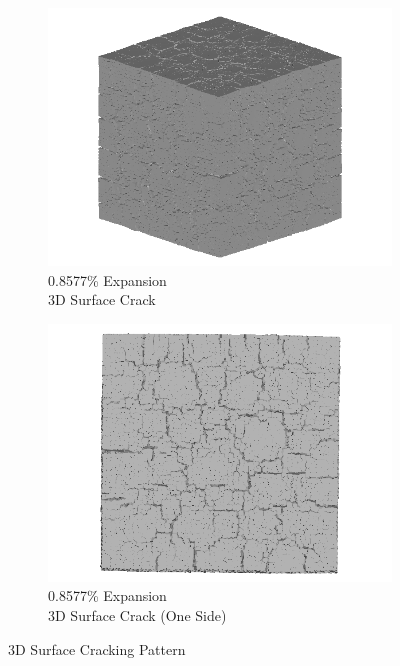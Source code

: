 \begin{figure}[ht!]
    \begin{subfigure}{.5\textwidth}
      \centering
      \includegraphics[width=0.5\linewidth]{Files/exp_3D/DEF/A30X-5C_4_3d.png}
      \caption{0.8577\% Expansion\\3D Surface Crack}
    \end{subfigure}%
    \begin{subfigure}{.5\textwidth}
      \centering
      \includegraphics[width=0.5\linewidth]{Files/exp_3D/DEF/A30X-5C_4_3ds.png}
      \caption{0.8577\% Expansion\\3D Surface Crack (One Side)}
    \end{subfigure}%

\caption{3D Surface Cracking Pattern}
\label{fig:A30_3Dcrack}
\end{figure}
